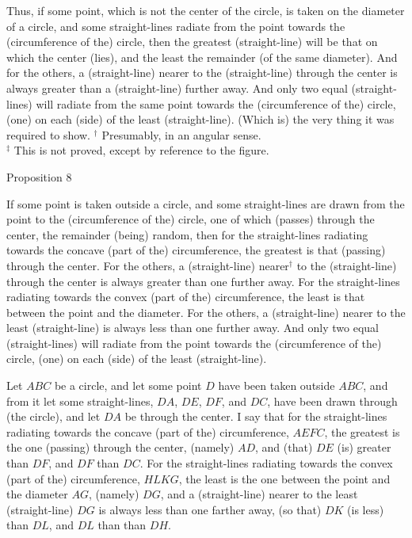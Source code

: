Thus, if some point, which is not the
center of the circle, is taken on the diameter of a circle,
and some straight-lines radiate from the point towards
the (circumference of the) circle, then the greatest (straight-line) will be that on which
the center (lies), and the least the remainder (of the same diameter). And
for the others, a (straight-line) nearer to the (straight-line) through the center is always
greater than a (straight-line) further away. And only two equal (straight-lines)
will radiate from the same point towards the (circumference of the) circle,  (one)
on each (side) of the least (straight-line). (Which is) the very thing it was required to show.
{\footnotesize \noindent$^\dag$ Presumably, in an angular sense.\\
$^\ddag$ This is not proved, except by reference to the figure.}


\begin{center}
{\large Proposition 8}
\end{center}

If some point is taken outside a circle, and some straight-lines are
drawn from the point to the (circumference of the) circle, one of which (passes) through the
center, the remainder  (being) random, then for the straight-lines
radiating towards the concave (part of the) circumference, the
greatest is  that (passing) through the center. For the others, a (straight-line)
nearer$^\dag$ to the (straight-line) through the center is always greater than one
further away. For the straight-lines radiating towards the convex (part of
the) circumference, the least is that between the point and the
diameter. For the others, a (straight-line) nearer to the least
(straight-line) is always less than one further away. And only
two equal (straight-lines) will radiate from the point towards the (circumference of the) circle, (one) on each (side)
of the least (straight-line).

Let $ABC$ be a circle, and let some point $D$ have been taken outside $ABC$,
and from it let some straight-lines, $DA$, $DE$, $DF$, and $DC$, have been
drawn through (the circle), and let $DA$ be through the center. I say 
that for the straight-lines radiating towards the concave (part of the)
circumference, $AEFC$, the greatest is the one (passing) through the center,  (namely) $AD$,
and (that) $DE$ (is) greater than $DF$, and $DF$ than $DC$. For the straight-lines
radiating towards the convex (part of the) circumference, $HLKG$, the
least is the one between the point and the diameter $AG$, (namely) $DG$, 
and  a (straight-line) nearer to the least (straight-line) $DG$ is
always less than one farther away, (so that) $DK$ (is less) than $DL$, and $DL$ than than
$DH$.

